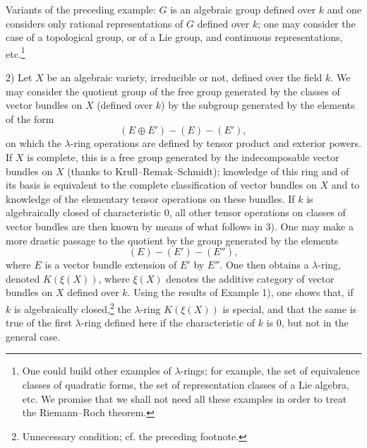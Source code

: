 Variants of the preceding example: $G$ is an algebraic group defined over $k$ and one considers only rational representations of $G$ defined over $k$; one may consider the case of a topological group, or of a Lie group, and continuous representations, etc.\footnote{One could build other examples of $\lambda$-rings; for example, the set of equivalence classes of quadratic forms, the set of representation classes of a Lie algebra, etc. We promise that we shall not need all these examples in order to treat the Riemann--Roch theorem.}

2) Let $X$ be an algebraic variety, irreducible or not, defined over the field $k$. We may consider the quotient group of the free group generated by the classes of vector bundles on $X$ (defined over $k$) by the subgroup generated by the elements of the form
\[
(E\oplus E')-(E)-(E'),
\]
on which the $\lambda$-ring operations are defined by tensor product and exterior powers. If $X$ is complete, this is a free group generated by the indecomposable vector bundles on $X$ (thanks to Krull--Remak--Schmidt); knowledge of this ring and of its basis is equivalent to the complete classification of vector bundles on $X$ and to knowledge of the elementary tensor operations on these bundles. If $k$ is algebraically closed of characteristic $0$, all other tensor operations on classes of vector bundles are then known by means of what follows in 3). One may make a more drastic passage to the quotient by the group generated by the elements
\[
(E)-(E')-(E''),
\]
where $E$ is a vector bundle extension of $E'$ by $E''$. One then obtains a $\lambda$-ring, denoted $K(\xi(X))$, where $\xi(X)$ denotes the additive category of vector bundles on $X$ defined over $k$. Using the results of Example 1), one shows that, if $k$ is algebraically closed,\footnote{Unnecessary condition; cf. the preceding footnote.} the $\lambda$-ring $K(\xi(X))$ is special, and that the same is true of the first $\lambda$-ring defined here if the characteristic of $k$ is $0$, but not in the general case.

